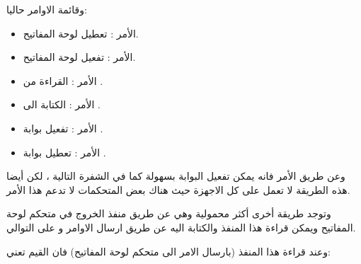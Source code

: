 \documentclass[document.tex]{subfiles}
\begin{document}
وقائمة الاوامر حاليا:
\begin{itemize}
\item الأمر : تعطيل لوحة المفاتيح.
\item الأمر : تفعيل لوحة المفاتيح.
\item الأمر : القراءة من .
\item الأمر : الكتابة الى .
\item الأمر : تفعيل بوابة .
\item الأمر : تعطيل بوابة .

\end{itemize}

وعن طريق الأمر  فانه يمكن تفعيل البوابة  بسهولة كما في الشفرة التالية ، لكن أيضا هذه الطريقة لا تعمل على كل الاجهزة حيث هناك بعض المتحكمات لا تدعم هذا الأمر.

\begin{english}
\lstset{numberstyle=\tiny,numbers=left,stepnumber=1,numbersep=5pt,tabsize=2,extendedchars=true,breaklines=true,frame=b,showspaces=false, showtabs=false,xleftmargin=10pt,framexleftmargin=10pt,framexrightmargin=5pt,framexbottommargin=4pt,showstringspaces=false,language=[x86masm]Assembler}


\end{english}

وتوجد طريقة أخرى أكثر محمولية وهي عن طريق منفذ الخروج  في متحكم لوحة المفاتيح ويمكن قراءة هذا المنفذ والكتابة اليه عن طريق ارسال الاوامر  و  على التوالي.

وعند قراءة هذا المنفذ (بارسال الامر  الى متحكم لوحة المفاتيح) فان القيم تعني:
\end{document}
